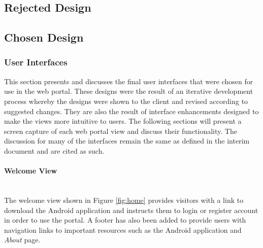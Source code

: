 \documentclass[11pt,a4paper]{report}
\begin{document}
\subsection{Rejected Design}
\label{sec:portal-rejected-design}

\subsection{Chosen Design}
\label{sec:portal-chosen-design}

\subsubsection{User Interfaces}
\label{sec:portal-user-interfaces}

This section presents and discusses the final user interfaces that were chosen for use in the web portal. These designs were the result of an iterative development process whereby the designs were shown to the client and revised according to suggested changes. They are also the result of interface enhancements designed to make the views more intuitive to users. The following sections will present a screen capture of each web portal view and discuss their functionality. The discussion for many of the interfaces remain the same as defined in the interim document and are cited as such.



\paragraph{Welcome View}\mbox{}\\
The welcome view shown in Figure \ref{fig:home} provides visitors with a link to download the Android application and instructs them to login or register account in order to use the portal. A footer has also been added to provide users with navigation links to important resources such as the Android application and \emph{About} page\cite{milestone2}.
\end{document}
